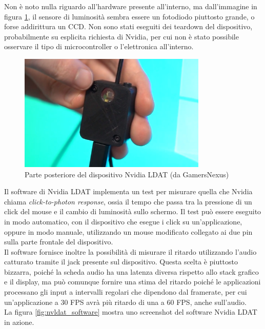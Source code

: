Non è noto nulla riguardo all'hardware presente all'interno, ma dall'immagine in figura \ref{fig:nvldat_back}, il sensore di luminosità sembra essere un fotodiodo piuttosto grande, o forse addirittura un CCD. Non sono stati eseguiti dei teardown del dispositivo, probabilmente su esplicita richiesta di Nvidia, per cui non è stato possibile osservare il tipo di microcontroller o l'elettronica all'interno.

\begin{figure}[h!]
	\centering
	\includegraphics[width=0.8\textwidth]{StatoDellArte_files/nvldat_back.jpg}
	\caption{Parte posteriore del dispositivo Nvidia LDAT (da GamersNexus)}
	\label{fig:nvldat_back}
\end{figure}

Il software di Nvidia LDAT implementa un test per misurare quella che Nvidia chiama \textit{click-to-photon response}, ossia il tempo che passa tra la pressione di un click del mouse e il cambio di luminosità sullo schermo. Il test può essere eseguito in modo automatico, con il dispositivo che esegue i click su un'applicazione, oppure in modo manuale, utilizzando un mouse modificato collegato ai due pin sulla parte frontale del dispositivo.\\
Il software fornisce inoltre la possibilità di misurare il ritardo utilizzando l'audio catturato tramite il jack presente sul dispositivo. Questa scelta è piuttosto bizzarra, poiché la scheda audio ha una latenza diversa rispetto allo stack grafico e il display, ma può comunque fornire una stima del ritardo poiché le applicazioni processano gli input a intervalli regolari che dipendono dal framerate, per cui un'applicazione a 30 FPS avrà più ritardo di una a 60 FPS, anche sull'audio.\\
La figura \ref{fig:nvldat_software} mostra uno screenshot del software Nvidia LDAT in azione.

